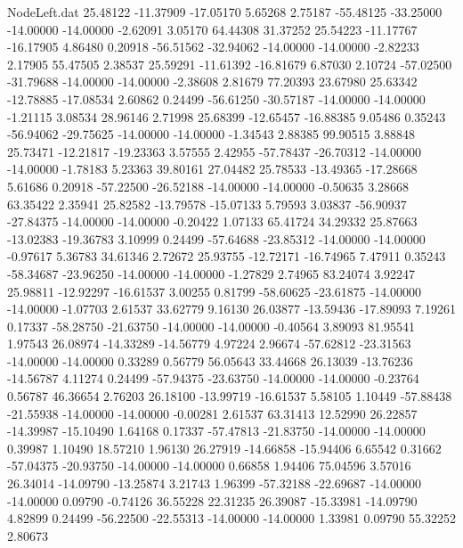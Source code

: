 \begin{filecontents}{NodeLeft.dat}
  25.48122  -11.37909  -17.05170     5.65268    2.75187  -55.48125  -33.25000  -14.00000  -14.00000   -2.62091    3.05170   64.44308   31.37252
  25.54223  -11.17767  -16.17905     4.86480    0.20918  -56.51562  -32.94062  -14.00000  -14.00000   -2.82233    2.17905   55.47505    2.38537
  25.59291  -11.61392  -16.81679     6.87030    2.10724  -57.02500  -31.79688  -14.00000  -14.00000   -2.38608    2.81679   77.20393   23.67980
  25.63342  -12.78885  -17.08534     2.60862    0.24499  -56.61250  -30.57187  -14.00000  -14.00000   -1.21115    3.08534   28.96146    2.71998
  25.68399  -12.65457  -16.88385     9.05486    0.35243  -56.94062  -29.75625  -14.00000  -14.00000   -1.34543    2.88385   99.90515    3.88848
  25.73471  -12.21817  -19.23363     3.57555    2.42955  -57.78437  -26.70312  -14.00000  -14.00000   -1.78183    5.23363   39.80161   27.04482
  25.78533  -13.49365  -17.28668     5.61686    0.20918  -57.22500  -26.52188  -14.00000  -14.00000   -0.50635    3.28668   63.35422    2.35941
  25.82582  -13.79578  -15.07133     5.79593    3.03837  -56.90937  -27.84375  -14.00000  -14.00000   -0.20422    1.07133   65.41724   34.29332
  25.87663  -13.02383  -19.36783     3.10999    0.24499  -57.64688  -23.85312  -14.00000  -14.00000   -0.97617    5.36783   34.61346    2.72672
  25.93755  -12.72171  -16.74965     7.47911    0.35243  -58.34687  -23.96250  -14.00000  -14.00000   -1.27829    2.74965   83.24074    3.92247
  25.98811  -12.92297  -16.61537     3.00255    0.81799  -58.60625  -23.61875  -14.00000  -14.00000   -1.07703    2.61537   33.62779    9.16130
  26.03877  -13.59436  -17.89093     7.19261    0.17337  -58.28750  -21.63750  -14.00000  -14.00000   -0.40564    3.89093   81.95541    1.97543
  26.08974  -14.33289  -14.56779     4.97224    2.96674  -57.62812  -23.31563  -14.00000  -14.00000    0.33289    0.56779   56.05643   33.44668
  26.13039  -13.76236  -14.56787     4.11274    0.24499  -57.94375  -23.63750  -14.00000  -14.00000   -0.23764    0.56787   46.36654    2.76203
  26.18100  -13.99719  -16.61537     5.58105    1.10449  -57.88438  -21.55938  -14.00000  -14.00000   -0.00281    2.61537   63.31413   12.52990
  26.22857  -14.39987  -15.10490     1.64168    0.17337  -57.47813  -21.83750  -14.00000  -14.00000    0.39987    1.10490   18.57210    1.96130
  26.27919  -14.66858  -15.94406     6.65542    0.31662  -57.04375  -20.93750  -14.00000  -14.00000    0.66858    1.94406   75.04596    3.57016
  26.34014  -14.09790  -13.25874     3.21743    1.96399  -57.32188  -22.69687  -14.00000  -14.00000    0.09790   -0.74126   36.55228   22.31235
  26.39087  -15.33981  -14.09790     4.82899    0.24499  -56.22500  -22.55313  -14.00000  -14.00000    1.33981    0.09790   55.32252    2.80673

\end{filecontents}

